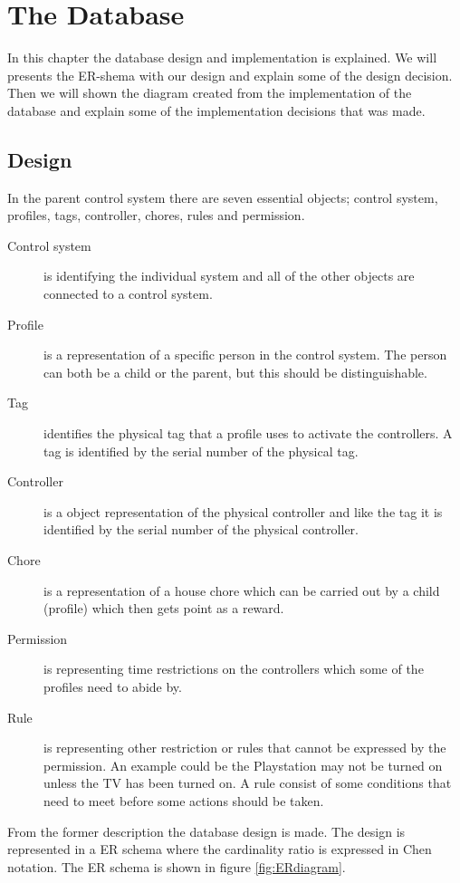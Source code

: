 \chapter{The Database}
In this chapter the database design and implementation is explained. We will presents the ER-shema with our design and explain some of the design decision. Then we will shown the diagram created from the implementation of the database and explain some of the implementation decisions that was made. 
  
\section{Design}
In the parent control system there are seven essential objects; control system, profiles, tags, controller, chores, rules and permission. 

\begin{description}
	\item[Control system] is identifying the individual system and all of the other objects are connected to a control system.
	\item[Profile] is a representation of a specific person in the control system. The person can both be a child or the parent, but this should be distinguishable.
	\item[Tag] identifies the physical tag that a profile uses to activate the controllers. A tag is identified by the serial number of the physical tag.
	\item[Controller]	is a object representation of the physical controller and like the tag it is identified by the serial number of the physical controller.
	\item[Chore] is a representation of a house chore which can be carried out by a child (profile) which then gets point as a reward.
	\item[Permission] is representing time restrictions on the controllers which some of the profiles need to abide by. 
	\item[Rule] is representing other restriction or rules that cannot be expressed by the permission. An example could be the Playstation may not be turned on unless the TV has been turned on. A rule consist of some conditions that need to meet before some actions should be taken. 
\end{description}

From the former description the database design is made. The design is represented in a ER schema where the cardinality ratio is expressed in 
Chen notation. The ER schema is shown in figure \ref{fig:ERdiagram}. 

